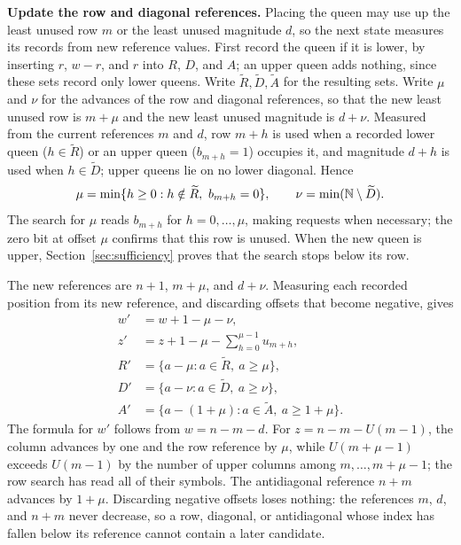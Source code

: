 \medskip\noindent
\textbf{Update the row and diagonal references.}
Placing the queen may use up the least unused row $m$ or the least
unused magnitude $d$, so the next state measures its records from
new reference values. First record the queen if it is lower, by
inserting $r$, $w-r$, and $r$ into $R$, $D$, and $A$; an upper queen
adds nothing, since these sets record only lower queens. Write
$\widetilde R,\widetilde D,\widetilde A$ for the resulting sets.
Write $\mu$ and $\nu$ for the advances of the row and diagonal
references, so that the new least unused row is $m+\mu$ and the new
least unused magnitude is $d+\nu$. Measured from the current
references $m$ and $d$, row $m+h$ is used when a recorded lower queen
($h\in\widetilde R$) or an upper queen ($b_{m+h}=1$) occupies it, and
magnitude $d+h$ is used when $h\in\widetilde D$; upper queens lie on
no lower diagonal. Hence
\[
 \mu=\min\{h\ge0:h\notin\widetilde R,\ b_{m+h}=0\},\qquad
 \nu=\min(\N\setminus\widetilde D).
\]
The search for $\mu$ reads $b_{m+h}$ for $h=0,\dots,\mu$, making
requests when necessary; the zero bit at offset $\mu$ confirms that
this row is unused. When the new queen is upper,
Section~\ref{sec:sufficiency} proves that the search stops below its
row.

The new references are $n+1$, $m+\mu$, and $d+\nu$. Measuring each
recorded position from its new reference, and discarding offsets
that become negative, gives
\begin{equation}\label{eq:update}
 \begin{aligned}
 w'&=w+1-\mu-\nu,\\
 z'&=z+1-\mu-\textstyle\sum_{h=0}^{\mu-1}u_{m+h},\\
 R'&=\{a-\mu:a\in\widetilde R,\ a\ge\mu\},\\
 D'&=\{a-\nu:a\in\widetilde D,\ a\ge\nu\},\\
 A'&=\{a-(1+\mu):a\in\widetilde A,\ a\ge1+\mu\}.
 \end{aligned}
\end{equation}
The formula for $w'$ follows from $w=n-m-d$. For $z=n-m-U(m-1)$, the
column advances by one and the row reference by $\mu$, while
$U(m+\mu-1)$ exceeds $U(m-1)$ by the number of upper columns among
$m,\dots,m+\mu-1$; the row search has read all of their symbols. The
antidiagonal reference $n+m$ advances by $1+\mu$. Discarding negative
offsets loses nothing: the references $m$, $d$, and $n+m$ never
decrease, so a row, diagonal, or antidiagonal whose index has fallen
below its reference cannot contain a later candidate.

